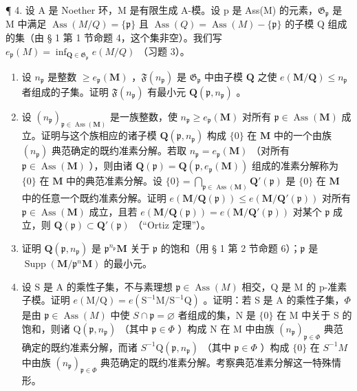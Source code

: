 ¶ 4. 设 A 是 Noether 环，M 是有限生成 A-模。设 p 是 Ass(M) 的元素，\(\mathfrak{G}_{\mathfrak{p}}\) 是 M 中满足 \(\operatorname{Ass}(M/Q) = \{\mathfrak{p}\}\) 且 \(\operatorname{Ass}(Q) = \operatorname{Ass}(M) - \{\mathfrak{p}\}\) 的子模 Q 组成的集（由 § 1 第 1 节命题 4，这个集非空）。我们写 \(e_{\mathfrak{p}}(M) = \inf_{\mathbf{Q} \in \mathfrak{G}_{\mathfrak{p}}} e(M/Q)\) （习题 3）。

\begin{enumerate}
\def\labelenumi{(\alph{enumi})}
\item
  设 \(n_{\mathfrak{p}}\) 是整数 \(\geqslant e_{\mathfrak{p}}(\mathbf{M})\) ，\(\mathfrak{F}(n_{\mathfrak{p}})\) 是 \(\mathfrak{G}_{\mathfrak{p}}\) 中由子模 \(\mathbf{Q}\) 之使 \(e(\mathbf{M} / \mathbf{Q}) \leqslant n_{\mathfrak{p}}\) 者组成的子集。证明 \(\mathfrak{F}(n_{\mathfrak{p}})\) 有最小元 \(\mathbf{Q}(\mathfrak{p}, n_{\mathfrak{p}})\) 。
\item
  设 \((n_{\mathfrak{p}})_{\mathfrak{p} \in \operatorname{Ass}(\mathbf{M})}\) 是一族整数，使 \(n_{\mathfrak{p}} \geqslant e_{\mathfrak{p}}(\mathbf{M})\) 对所有 \(\mathfrak{p} \in \operatorname{Ass}(\mathbf{M})\) 成立。证明与这个族相应的诸子模 \(\mathbf{Q}(\mathfrak{p}, n_{\mathfrak{p}})\) 构成 \(\{0\}\) 在 \(\mathbf{M}\) 中的一个由族 \((n_{\mathfrak{p}})\) 典范确定的既约准素分解。若取 \(n_{\mathfrak{p}} = e_{\mathfrak{p}}(\mathbf{M})\) （对所有 \(\mathfrak{p} \in \operatorname{Ass}(\mathbf{M})\) ），则由诸 \(\mathbf{Q}(\mathfrak{p}) = \mathbf{Q}(\mathfrak{p}, e_{\mathfrak{p}}(\mathbf{M}))\) 组成的准素分解称为 \(\{0\}\) 在 \(\mathbf{M}\) 中的典范准素分解。设 \(\{0\} = \bigcap_{\mathfrak{p} \in \operatorname{Ass}(\mathbf{M})} \mathbf{Q}'(\mathfrak{p})\) 是 \(\{0\}\) 在 \(\mathbf{M}\) 中的任意一个既约准素分解。证明 \(e(\mathbf{M}/\mathbf{Q}(\mathfrak{p})) \leqslant e(\mathbf{M}/\mathbf{Q}'(\mathfrak{p}))\) 对所有 \(\mathfrak{p} \in \operatorname{Ass}(\mathbf{M})\) 成立，且若 \(e(\mathbf{M}/\mathbf{Q}(\mathfrak{p})) = e(\mathbf{M}/\mathbf{Q}'(\mathfrak{p}))\) 对某个 \(\mathfrak{p}\) 成立，则 \(\mathbf{Q}(\mathfrak{p}) \subset \mathbf{Q}'(\mathfrak{p})\) （``Ortiz 定理''）。
\item
  证明 \(\mathbf{Q}(\mathfrak{p}, n_{\mathfrak{p}})\) 是 \(\mathfrak{p}^{n_{\mathfrak{p}}} \mathbf{M}\) 关于 \(\mathfrak{p}\) 的饱和（用 § 1 第 2 节命题 6）；\(\mathfrak{p}\) 是 \(\operatorname{Supp}(\mathbf{M} / \mathfrak{p}^n\mathbf{M})\) 的最小元。
\item
  设 S 是 A 的乘性子集，不与素理想 \(\mathfrak{p} \in \operatorname{Ass}(M)\) 相交，Q 是 M 的 p-准素子模。证明 \(e(\mathrm{M}/\mathrm{Q}) = e(\mathrm{S}^{-1}\mathrm{M}/\mathrm{S}^{-1}\mathrm{Q})\) 。证明：若 S 是 A 的乘性子集，\(\Phi\) 是由 \(\mathfrak{p} \in \operatorname{Ass}(M)\) 中使 \(S \cap \mathfrak{p} = \varnothing\) 者组成的集，N 是 \(\{0\}\) 在 M 中关于 S 的饱和，则诸 \(\mathrm{Q}(\mathfrak{p}, n_{\mathfrak{p}})\) （其中 \(\mathfrak{p} \in \Phi\) ）构成 N 在 M 中由族 \((n_{\mathfrak{p}})_{\mathfrak{p} \in \Phi}\) 典范确定的既约准素分解，而诸 \(S^{-1}\mathrm{Q}(\mathfrak{p}, n_{\mathfrak{p}})\) （其中 \(\mathfrak{p} \in \Phi\) ）构成 \(\{0\}\) 在 \(S^{-1}M\) 中由族 \((n_{\mathfrak{p}})_{\mathfrak{p} \in \Phi}\) 典范确定的既约准素分解。考察典范准素分解这一特殊情形。
\end{enumerate}

